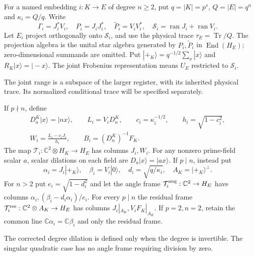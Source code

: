 \begin{definition}
For a named embedding $i:K\to E$ of degree $n\geq2$, put
$q=|K|=p^s$, $Q=|E|=q^n$ and $\kappa_i=Q/q$. Write
\[
 \Gamma_i=J_i^*V_i,\quad P_i=J_iJ_i^*,\quad
 \widetilde P_i=V_iV_i^*,\quad
 \mathcal S_i=\operatorname{ran}J_i+\operatorname{ran}V_i.
\]
Let $E_i$ project orthogonally onto $\mathcal S_i$, and use the physical
trace $\tau_E=\operatorname{Tr}/Q$. The projection algebra is the unital
star algebra generated by $P_i,\widetilde P_i$ in $\operatorname{End}(H_E)$;
zero-dimensional summands are omitted. Put
$|+_K\rangle=q^{-1/2}\sum_x|x\rangle$ and $R_K|x\rangle=|-x\rangle$.
The joint Frobenius representation means $U_E$ restricted to $\mathcal S_i$.
\end{definition}
\begin{scope}
The joint range is a subspace of the larger register, with its inherited
physical trace. Its normalized conditional trace will be specified separately.
\end{scope}

\begin{definition}
If $p\nmid n$, define
\begin{gather*}
 D_n^K|x\rangle=|nx\rangle,\qquad L_i=V_iD_n^K,\qquad
 c_i=\kappa_i^{-1/2},\qquad h_i=\sqrt{1-c_i^2},\\
 W_i=\frac{L_i-c_iJ_i}{h_i},\qquad B_i=(D_n^K)^{-1}F_K.
\end{gather*}
The map $\mathcal T_i:\mathbb C^2\otimes H_K\to H_E$ has columns
$J_i,W_i$. For any nonzero prime-field scalar $a$, scalar dilations on
each field are $D_a|x\rangle=|ax\rangle$.
If $p\mid n$, instead put
\[
 \alpha_i=J_i|+_K\rangle,\quad\beta_i=V_i|0\rangle,\quad
 d_i=\sqrt{q/\kappa_i},\quad A_K=|+_K\rangle^\perp.
\]
For $n>2$ put $e_i=\sqrt{1-d_i^2}$ and let the angle frame
$\mathcal T_i^{\rm ang}:\mathbb C^2\to H_E$ have columns
$\alpha_i,(\beta_i-d_i\alpha_i)/e_i$. For every $p\mid n$ the residual
frame $\mathcal T_i^{\rm res}:\mathbb C^2\otimes A_K\to H_E$ has columns
$J_i|_{A_K},V_iF_K|_{A_K}$. If $p=2,n=2$, retain the common line
$\mathbb C\alpha_i=\mathbb C\beta_i$ and only the residual frame.
\end{definition}
\begin{scope}
The corrected degree dilation is defined only when the degree is invertible.
The singular quadratic case has no angle frame requiring division by zero.
\end{scope}


